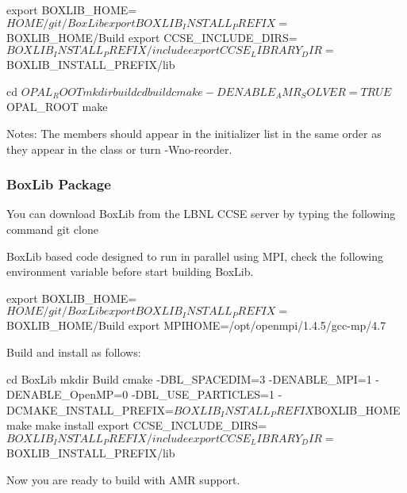 \begin{footnotesize}
\begin{example}
export BOXLIB_HOME=$HOME/git/BoxLib
export BOXLIB_INSTALL_PREFIX=$BOXLIB_HOME/Build
export CCSE_INCLUDE_DIRS=$BOXLIB_INSTALL_PREFIX/include
export CCSE_LIBRARY_DIR=$BOXLIB_INSTALL_PREFIX/lib
\end{example}
 \label{ssec:envvar_AMR}
\end{footnotesize}


\begin{footnotesize}
\begin{example}
cd $OPAL_ROOT
mkdir build
cd build
cmake -DENABLE_AMR_SOLVER=TRUE $OPAL_ROOT
make
\end{example}
\end{footnotesize}

Notes:
The members should appear in the initializer list in the same order as they
appear in the class or turn -Wno-reorder.


\subsubsection{BoxLib Package}
\label{ssubsection:BoxLibBuild}

You can download BoxLib from the LBNL CCSE server by typing the following command {\rm git clone}
\begin{footnotesize}
\end{footnotesize}

BoxLib based code designed to run in parallel using MPI, check the following environment variable
before start building BoxLib.
\begin{example}
export BOXLIB_HOME=$HOME/git/BoxLib
export BOXLIB_INSTALL_PREFIX=$BOXLIB_HOME/Build
export MPIHOME=/opt/openmpi/1.4.5/gcc-mp/4.7
\end{example}

Build and install as follows:
\begin{footnotesize}
\begin{example}
cd BoxLib
mkdir Build
cmake -DBL_SPACEDIM=3 -DENABLE_MPI=1 -DENABLE_OpenMP=0 -DBL_USE_PARTICLES=1
            -DCMAKE_INSTALL_PREFIX=$BOXLIB_INSTALL_PREFIX $BOXLIB_HOME
make
make install
export CCSE_INCLUDE_DIRS=$BOXLIB_INSTALL_PREFIX/include
export CCSE_LIBRARY_DIR=$BOXLIB_INSTALL_PREFIX/lib
\end{example}
\end{footnotesize}
Now you are ready to build \opal with AMR support.

